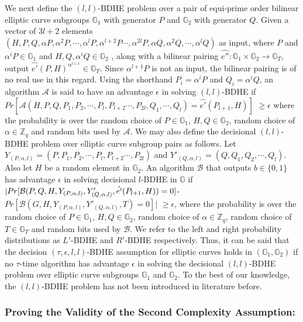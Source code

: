 We next define the $(l,l)$-BDHE problem over a pair of equi-prime order bilinear elliptic curve subgroups $\mathbb{G}_1$ with generator $P$ and $\mathbb{G}_2$ with generator $Q$. Given a vector of $3l+2$ elements\\ $(H,P,Q, \alpha P, {\alpha}^2P,\cdots,{\alpha}^{l}P,{\alpha}^{l+2}P\cdots,{\alpha}^{2l}P,\alpha Q, {\alpha}^2Q,\cdots,{\alpha}^{l}Q)$ as input, where $P$ and ${\alpha}^iP \in \mathbb{G}_1$ and $H,Q,\alpha^iQ \in \mathbb{G}_2$ , along with a bilinear pairing $\hat{e''}:\mathbb{G}_1 \times \mathbb{G}_2\longrightarrow\mathbb{G}_T$, output $\hat{e'}(P,H)^{\alpha^{l+1}}\in\mathbb{G}_T$. Since ${\alpha}^{l+1}P$ is not an input, the bilinear pairing is of no real use in this regard. Using the shorthand $P_i = \alpha^{i}P$ and $Q_i=\alpha^{i}Q$, an algorithm $\mathcal{A}$ is said to have an advantage $\epsilon$ in solving $(l,l)$-BDHE if 
$Pr[\mathcal{A}(H,P,Q,P_1, P_2,\cdots,P_l,P_{l+2}\cdots,P_{2l},Q_1,\cdots,Q_l)=\hat{e'}(P_{l+1},H)]$ $\geq \epsilon$
where the probability is over the random choice of $P \in \mathbb{G}_1$, $H,Q \in \mathbb{G}_2$, random choice of $\alpha \in \mathbb{Z}_q$ and random bits used by $\mathcal{A}$. We may also define the decisional $(l,l)$-BDHE problem over elliptic curve subgroup pairs as follows. Let $Y_{(P,\alpha,l)}=(P,P_1, P_2,\cdots,P_l,P_{l+2}\cdots,P_{2l})$ and $Y'_{(Q,\alpha,l)}=(Q,Q_1, Q_2,\cdots,Q_l)$. Also let $H$ be a random element in $\mathbb{G}_2$. An algorithm $\mathcal{B}$ that outputs $b\in\{0,1\}$ has advantage $\epsilon$ in solving decisional $l$-BDHE in $\mathbb{G}$ if $|Pr[\mathcal{B}(P,Q,H,Y_{(P,\alpha,l)},Y'_{(Q,\alpha,l)},\hat{e'}(P_{l+1},H))\\=0]$-$Pr[\mathcal{B}(G,H,Y_{(P,\alpha,l)},Y'_{(Q,\alpha,l)},T)=0]|$ $\geq \epsilon$, where the probability is over the random choice of $P \in \mathbb{G}_1$, $H,Q \in \mathbb{G}_2$, random choice of $\alpha \in \mathbb{Z}_q$, random choice of $T\in \mathbb{G}_T$ and random bits used by $\mathcal{B}$. We refer to the left and right probability distributions as $L'$-BDHE and $R'$-BDHE respectively. Thus, it can be said that the decision $(\tau,\epsilon,l,l)$-BDHE assumption for elliptic curves holds in $(\mathbb{G}_1,\mathbb{G}_2)$ if no $\tau$-time algorithm has advantage $\epsilon$  in solving the decisional $(l,l)$-BDHE problem over elliptic curve subgroups $\mathbb{G}_1$ and $\mathbb{G}_2$. To the best of our knowledge, the $(l,l)$-BDHE problem has not been introduced in literature before.

\subsubsection{Proving the Validity of the Second Complexity Assumption:}
\label{app_sec:hardness}

